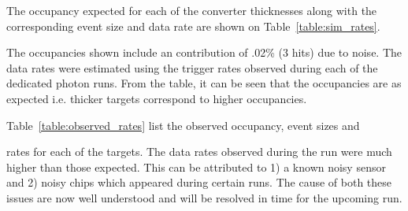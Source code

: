 The occupancy expected for each of the converter thicknesses along with the 
corresponding event size and data rate are shown on Table~\ref{table:sim_rates}.
\begin{table}[h]
    \caption{Occupancy, event size and resulting data rate expected for each of the three 
             converter thicknesses used in the test run.}
    \label{table:sim_rates}
\end{table}
The occupancies shown include an contribution of .02\% (3 hits) due to noise.  
The data rates were estimated using the trigger rates observed during each
of the dedicated photon runs. From the table, it can be seen that the 
occupancies are as expected i.e. thicker targets correspond to higher 
occupancies. 

Table~\ref{table:observed_rates} list the observed occupancy, event sizes and 
\begin{table}[h]
    \caption{Occupancy, event size and resulting data rate observed for each of the three 
             converter thicknesses used in the test run.}
    \label{table:observed_rates}
\end{table}    
rates for each of the targets.  The data rates observed during the run were
much higher than those expected.  This can be attributed to 1) a known
noisy sensor and 2) noisy chips which appeared during certain runs.  The cause
of both these issues are now well understood and will be resolved in time 
for the upcoming run.

